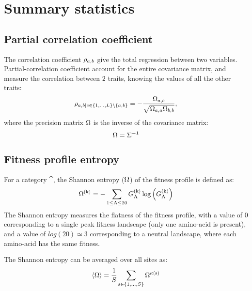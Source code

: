 \section{Summary statistics}
\label{sec:summary-statistics}

\subsection{Partial correlation coefficient}
\label{subsec:partial-correlation-coefficient}

The correlation coefficient $\rho_{a, b}$ give the total regression between two variables.
Partial-correlation coefficient account for the entire covariance matrix, and measure the correlation between $2$ traits, knowing the values of all the other traits:
\begin{equation}
    \rho_{a, b | c \in \{1, \hdots, L\} \setminus \{ a, b\} } = - \dfrac{\Omega_{a, b}}{\sqrt{\Omega_{a, a} \Omega_{b, b}}},
\end{equation}
where the precision matrix $\Omega$ is the inverse of the covariance matrix:
\begin{equation}
    \Omega = \Sigma^{-1}
\end{equation}

\subsection{Fitness profile entropy}
\label{subsec:fitness-profile-entropy}

For a category $\cat$, the Shannon entropy (${\Omega}$) of the fitness profile is defined as:
\begin{equation}
    {\Omega}^{(\text{k})} = - \sum\limits_{1 \leq \text{A} \leq 20} G^{(\text{k})}_{\text{A}} \log \left( G^{(\text{k})}_{\text{A}} \right)
\end{equation}
The Shannon entropy measures the flatness of the fitness profile, with a value of $0$ corresponding to a single peak fitness landscape (only one amino-acid is present), and a value of $log(20)\simeq3$ corresponding to a \gls{neutral} landscape, where each amino-acid has the same fitness.

The Shannon entropy can be averaged over all sites as:
\begin{equation}
    \langle {\Omega} \rangle = \dfrac{1}{S}\sum\limits_{\text{s} \in \{1, \hdots, S\}} {\Omega}^{\kappa\left(\text{s}\right)}
\end{equation}


